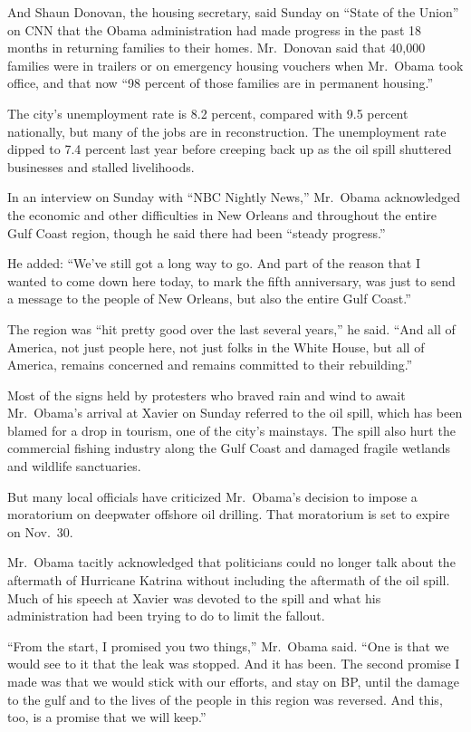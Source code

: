 ﻿\documentclass[12pt]{article}
\begin{document}
And Shaun Donovan, the housing secretary, said Sunday on ``State of the Union'' on CNN that the
Obama administration had made progress in the past 18 months in returning families to their homes.
Mr.~Donovan said that 40,000 families were in trailers or on emergency housing vouchers when
Mr.~Obama took office, and that now ``98 percent of those families are in permanent housing.''

The city's unemployment rate is 8.2 percent, compared with 9.5 percent nationally, but many of the
jobs are in reconstruction. The unemployment rate dipped to 7.4 percent last year before creeping
back up as the oil spill shuttered businesses and stalled livelihoods.

In an interview on Sunday with ``NBC Nightly News,'' Mr.~Obama acknowledged the economic and other
difficulties in New Orleans and throughout the entire Gulf Coast region, though he said there had
been ``steady progress.''

He added: ``We've still got a long way to go. And part of the reason that I wanted to come down here
today, to mark the fifth anniversary, was just to send a message to the people of New Orleans, but
also the entire Gulf Coast.''

The region was ``hit pretty good over the last several years,'' he said. ``And all of America, not
just people here, not just folks in the White House, but all of America, remains concerned and
remains committed to their rebuilding.''

Most of the signs held by protesters who braved rain and wind to await Mr.~Obama's arrival at Xavier
on Sunday referred to the oil spill, which has been blamed for a drop in tourism, one of the city's
mainstays. The spill also hurt the commercial fishing industry along the Gulf Coast and damaged
fragile wetlands and wildlife sanctuaries.

But many local officials have criticized Mr.~Obama's decision to impose a moratorium on deepwater
offshore oil drilling. That moratorium is set to expire on Nov.~30.

Mr.~Obama tacitly acknowledged that politicians could no longer talk about the aftermath of
Hurricane Katrina without including the aftermath of the oil spill. Much of his speech at Xavier was
devoted to the spill and what his administration had been trying to do to limit the fallout.

``From the start, I promised you two things,'' Mr.~Obama said. ``One is that we would see to it that
the leak was stopped. And it has been. The second promise I made was that we would stick with our
efforts, and stay on BP, until the damage to the gulf and to the lives of the people in this region
was reversed. And this, too, is a promise that we will keep.''
\end{document}

